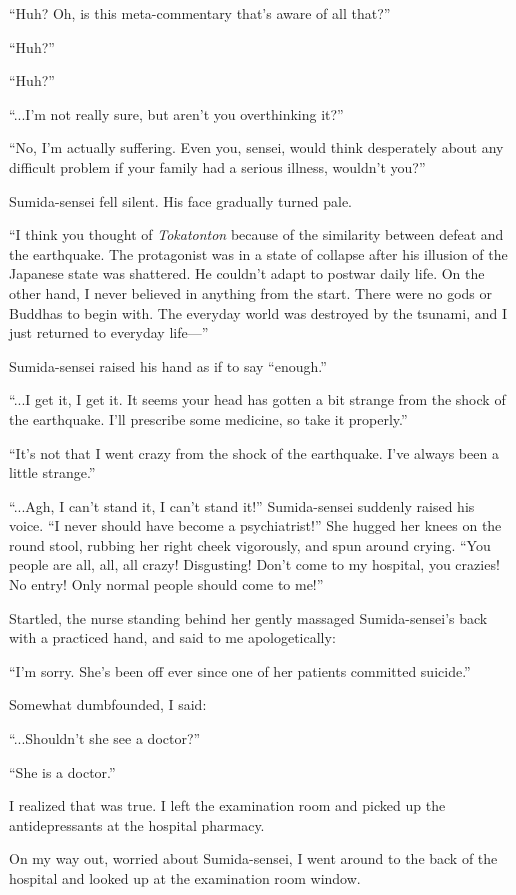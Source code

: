 \documentclass[
    a4paper,
    12pt,
    twoside,
    openany,
    UTF8,
    fontset=windows
]{ctexbook}
\begin{document}
``Huh? Oh, is this meta-commentary that's aware of all that?''

``Huh?''

``Huh?''

``...I'm not really sure, but aren't you overthinking it?''

``No, I'm actually suffering. Even you, sensei, would think desperately about any difficult problem if your family had a serious illness, wouldn't you?''

Sumida-sensei fell silent. His face gradually turned pale.

``I think you thought of \textit{Tokatonton} because of the similarity between defeat and the earthquake. The protagonist was in a state of collapse after his illusion of the Japanese state was shattered. He couldn't adapt to postwar daily life. On the other hand, I never believed in anything from the start. There were no gods or Buddhas to begin with. The everyday world was destroyed by the tsunami, and I just returned to everyday life---''

Sumida-sensei raised his hand as if to say ``enough.''

``...I get it, I get it. It seems your head has gotten a bit strange from the shock of the earthquake. I'll prescribe some medicine, so take it properly.''

``It's not that I went crazy from the shock of the earthquake. I've always been a little strange.''

``...Agh, I can't stand it, I can't stand it!'' Sumida-sensei suddenly raised his voice. ``I never should have become a psychiatrist!'' She hugged her knees on the round stool, rubbing her right cheek vigorously, and spun around crying. ``You people are all, all, all crazy! Disgusting! Don't come to my hospital, you crazies! No entry! Only normal people should come to me!''

Startled, the nurse standing behind her gently massaged Sumida-sensei's back with a practiced hand, and said to me apologetically:

``I'm sorry. She's been off ever since one of her patients committed suicide.''

Somewhat dumbfounded, I said:

``...Shouldn't she see a doctor?''

``She is a doctor.''

I realized that was true. I left the examination room and picked up the antidepressants at the hospital pharmacy.

On my way out, worried about Sumida-sensei, I went around to the back of the hospital and looked up at the examination room window.
\end{document}
